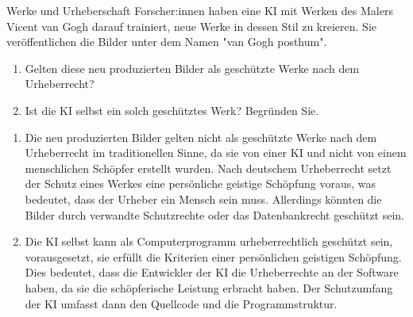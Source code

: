 \documentclass{article}
\begin{document}
\begin{exercise}{Werke und Urheberschaft}
  Forscher:innen haben eine KI mit Werken des Malers Vicent van Gogh darauf trainiert, neue Werke in dessen Stil zu kreieren. Sie veröffentlichen die Bilder unter dem Namen "van Gogh posthum".
  \begin{enumerate}
    \item Gelten diese neu produzierten Bilder als geschützte Werke nach dem Urheberrecht?
    \item Ist die KI selbst ein solch geschütztes Werk? Begründen Sie.
  \end{enumerate}

  \begin{solution}
    \begin{enumerate}
      \item Die neu produzierten Bilder gelten nicht als geschützte Werke nach dem Urheberrecht im traditionellen Sinne, da sie von einer KI und nicht von einem menschlichen Schöpfer erstellt wurden. Nach deutschem Urheberrecht setzt der Schutz eines Werkes eine persönliche geistige Schöpfung voraus, was bedeutet, dass der Urheber ein Mensch sein muss. Allerdings könnten die Bilder durch verwandte Schutzrechte oder das Datenbankrecht geschützt sein.
      \item Die KI selbst kann als Computerprogramm urheberrechtlich geschützt sein, vorausgesetzt, sie erfüllt die Kriterien einer persönlichen geistigen Schöpfung. Dies bedeutet, dass die Entwickler der KI die Urheberrechte an der Software haben, da sie die schöpferische Leistung erbracht haben. Der Schutzumfang der KI umfasst dann den Quellcode und die Programmstruktur.
    \end{enumerate}
  \end{solution}
\end{exercise}
\end{document}
